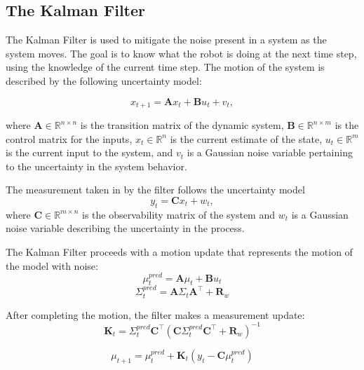 \subsection*{The Kalman Filter}
The Kalman Filter is used to mitigate the noise present in a system as the system moves.
The goal is to know what the robot is doing at the next time step, using the knowledge of the current time step.
The motion of the system is described by the following uncertainty model:

\begin{equation}
  x_{t+1} = \mathbf{A} x_t + \mathbf{B} u_t + v_t,
\end{equation}

\noindent where $\mathbf{A}\in\mathbb{R}^{n\times n}$ is the transition matrix of the dynamic system, $\mathbf{B}\in\mathbb{R}^{n\times m}$ is the control matrix for the inputs, $x_{t}\in\mathbb{R}^{n}$ is the current estimate of the state, $u_{t}\in\mathbb{R}^{m}$ is the current input to the system, and $v_t$ is a Gaussian noise variable pertaining to the uncertainty in the system behavior.

The measurement taken in by the filter follows the uncertainty model
\begin{equation}
  y_t = \mathbf{C} x_t + w_t,
\end{equation}
where $\mathbf{C}\in\mathbb{R}^{m\times n}$ is the observability matrix of the system and $w_t$ is a Gaussian noise variable describing the uncertainty in the process.

The Kalman Filter proceeds with a motion update that represents the motion of the model with noise:
\begin{equation}
  \mu_t^{pred} = \mathbf{A} \mu_t + \mathbf{B} u_t
\end{equation}
\begin{equation}
  \Sigma_t^{pred} = \mathbf{A} \Sigma_t \mathbf{A}^\intercal + \mathbf{R}_w
\end{equation}

After completing the motion, the filter makes a measurement update:
\begin{equation}
  \mathbf{K}_t = \Sigma_t^{pred} \mathbf{C}^{\intercal} (\mathbf{C} \Sigma_t^{pred} \mathbf{C}^{\intercal} + \mathbf{R}_w)^{-1}
\end{equation}

\begin{equation}
  \mu_{t+1} = \mu_t^{pred} + \mathbf{K}_{t} (y_t - \mathbf{C} \mu_t^{pred})
\end{equation}

